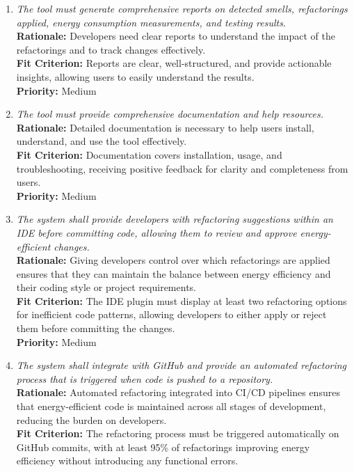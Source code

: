 \documentclass[12pt]{article}
\begin{document}
\begin{enumerate}[label=FR \arabic*., wide=0pt, leftmargin=*]
    {\bf Priority:} Medium
    \item \emph{The tool must generate comprehensive reports on detected smells, refactorings applied, energy consumption measurements, and testing results.}\\[2mm]
    {\bf Rationale:} Developers need clear reports to understand the impact of the refactorings and to track changes effectively.\\
    {\bf Fit Criterion:} Reports are clear, well-structured, and provide actionable insights, allowing users to easily understand the results.\\
    {\bf Priority:} Medium
    \item \emph{The tool must provide comprehensive documentation and help resources.}\\[2mm]
    {\bf Rationale:} Detailed documentation is necessary to help users install, understand, and use the tool effectively.\\
    {\bf Fit Criterion:} Documentation covers installation, usage, and troubleshooting, receiving positive feedback for clarity and completeness from users.\\
    {\bf Priority:} Medium
    \item \emph{The system shall provide developers with refactoring suggestions within an IDE before committing code, allowing them to review and approve energy-efficient changes.}\\[2mm]
    {\bf Rationale:} Giving developers control over which refactorings are applied ensures that they can maintain the balance between energy efficiency and their coding style or project requirements.\\
    {\bf Fit Criterion:} The IDE plugin must display at least two refactoring options for inefficient code patterns, allowing developers to either apply or reject them before committing the changes.\\
    {\bf Priority:} Medium
    \item \emph{The system shall integrate with GitHub and provide an automated refactoring process that is triggered when code is pushed to a repository.}\\[2mm]
    {\bf Rationale:} Automated refactoring integrated into CI/CD pipelines ensures that energy-efficient code is maintained across all stages of development, reducing the burden on developers.\\
    {\bf Fit Criterion:} The refactoring process must be triggered automatically on GitHub commits, with at least 95\% of refactorings improving energy efficiency without introducing any functional errors.\\

\end{enumerate}
\end{document}
